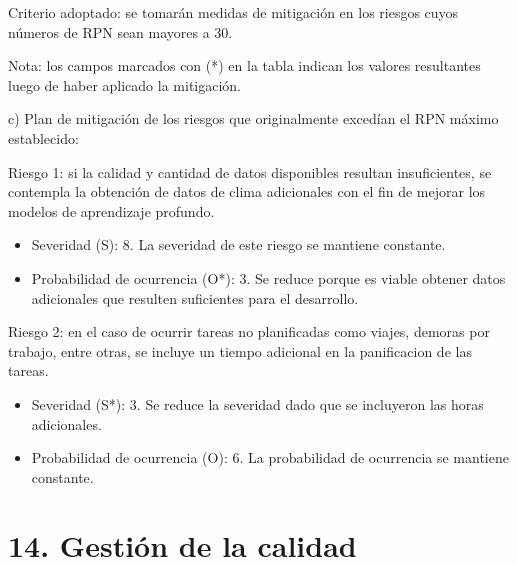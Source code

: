 \documentclass[
11pt, %
]{charter}
\begin{document}
Criterio adoptado: se tomarán medidas de mitigación en los riesgos cuyos números de RPN sean
mayores a 30.

Nota: los campos marcados con (*) en la tabla indican los valores resultantes luego de haber
aplicado la mitigación.


c) Plan de mitigación de los riesgos que originalmente excedían el RPN máximo establecido:

Riesgo 1: si la calidad y cantidad de datos disponibles resultan insuficientes, se contempla la obtención
de datos de clima adicionales con el fin de mejorar los modelos de aprendizaje profundo.

\begin{itemize} 
\item Severidad (S): 8.
La severidad de este riesgo se mantiene constante.
\item Probabilidad de ocurrencia (O*): 3.
Se reduce porque es viable obtener datos adicionales que resulten suficientes para el desarrollo.
\end{itemize}

Riesgo 2: en el caso de ocurrir tareas no planificadas como viajes, demoras por trabajo, entre otras, 
se incluye un tiempo adicional en la panificacion de las tareas.

\begin{itemize} 
\item Severidad (S*): 3.
Se reduce la severidad dado que se incluyeron las horas adicionales.
\item Probabilidad de ocurrencia (O): 6.
La probabilidad de ocurrencia se mantiene constante.
\end{itemize}

\section{14. Gestión de la calidad}
\label{sec:calidad}
\end{document}
